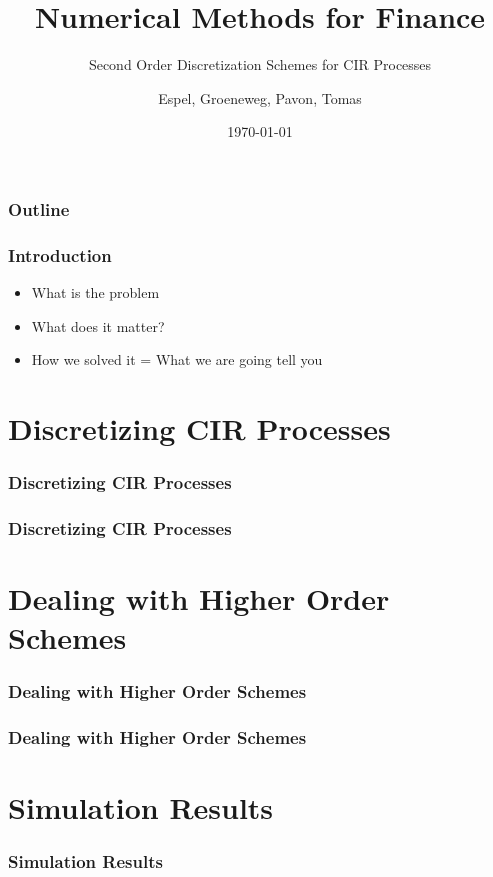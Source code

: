 \documentclass[12pt]{beamer}
\title{Numerical Methods for Finance}
\subtitle{Second Order Discretization Schemes for CIR Processes}
\author{Espel, Groeneweg, Pavon, Tomas}
\institute{Imperial College London}
\date{\today}
\begin{document}
\begin{frame}
    \titlepage
\end{frame}


\begin{frame}
\frametitle{Outline}
\tableofcontents
\end{frame}

\begin{frame}
\frametitle{Introduction}
\begin{itemize}
  \item What is the problem
  \item What does it matter?
  \item How we solved it = What we are going tell you
\end{itemize}
\end{frame}


\section{Discretizing CIR Processes}
\frame{\tableofcontents[currentsection]}

\begin{frame}
\frametitle{Discretizing CIR Processes}
\end{frame}

\begin{frame}
\frametitle{Discretizing CIR Processes}
\end{frame}



\section{Dealing with Higher Order Schemes}
\frame{\tableofcontents[currentsection]}

\begin{frame}
\frametitle{Dealing with Higher Order Schemes}
\end{frame}

\begin{frame}
\frametitle{Dealing with Higher Order Schemes}
\end{frame}





\section{Simulation Results}
\frame{\tableofcontents[currentsection]}

\begin{frame}
\frametitle{Simulation Results}
\end{frame}
\end{document}
